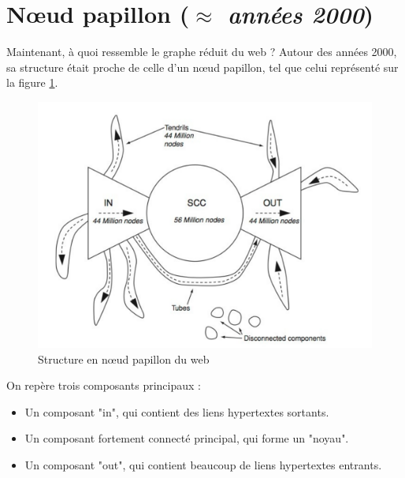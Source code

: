 \section{Nœud papillon (\textit{$\approx$ années 2000})}
	Maintenant, à quoi ressemble le graphe réduit du web ? Autour des années 2000, sa structure était proche de celle d'un nœud papillon, tel que celui représenté sur la figure \ref{noeud_papillon}.
	
	\begin{figure}[!ht]
		\centering
		\includegraphics[scale=0.25]{images/23_fig13-7.png}
		\caption{Structure en nœud papillon du web}
		\label{noeud_papillon}
	\end{figure}
	
	On repère trois composants principaux :
	\begin{itemize}
	\item Un composant "in", qui contient des liens hypertextes sortants.
	\item Un composant fortement connecté principal, qui forme un "noyau".
	\item Un composant "out", qui contient beaucoup de liens hypertextes entrants.
	\end{itemize}


